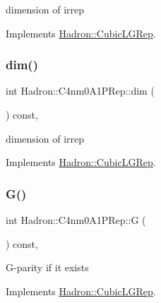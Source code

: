 dimension of irrep 

Implements \mbox{\hyperlink{structHadron_1_1CubicLGRep_a3acbaea26503ed64f20df693a48e4cdd}{Hadron\+::\+Cubic\+L\+G\+Rep}}.

\mbox{\label{structHadron_1_1C4nm0A1PRep_aabd15e62bba41adfc55ddc92338d88e5}} 
\subsubsection{\texorpdfstring{dim()}{dim()}\hspace{0.1cm}{\footnotesize\ttfamily [2/2]}}
{\footnotesize\ttfamily int Hadron\+::\+C4nm0\+A1\+P\+Rep\+::dim (\begin{DoxyParamCaption}{ }\end{DoxyParamCaption}) const\hspace{0.3cm}{\ttfamily [inline]}, {\ttfamily [virtual]}}

dimension of irrep 

Implements \mbox{\hyperlink{structHadron_1_1CubicLGRep_a3acbaea26503ed64f20df693a48e4cdd}{Hadron\+::\+Cubic\+L\+G\+Rep}}.

\mbox{\label{structHadron_1_1C4nm0A1PRep_a052b607d24099af097a92cb8c1191a1e}} 
\subsubsection{\texorpdfstring{G()}{G()}\hspace{0.1cm}{\footnotesize\ttfamily [1/2]}}
{\footnotesize\ttfamily int Hadron\+::\+C4nm0\+A1\+P\+Rep\+::G (\begin{DoxyParamCaption}{ }\end{DoxyParamCaption}) const\hspace{0.3cm}{\ttfamily [inline]}, {\ttfamily [virtual]}}

G-\/parity if it exists 

Implements \mbox{\hyperlink{structHadron_1_1CubicLGRep_ace26f7b2d55e3a668a14cb9026da5231}{Hadron\+::\+Cubic\+L\+G\+Rep}}.

\mbox{\label{structHadron_1_1C4nm0A1PRep_a052b607d24099af097a92cb8c1191a1e}} 
